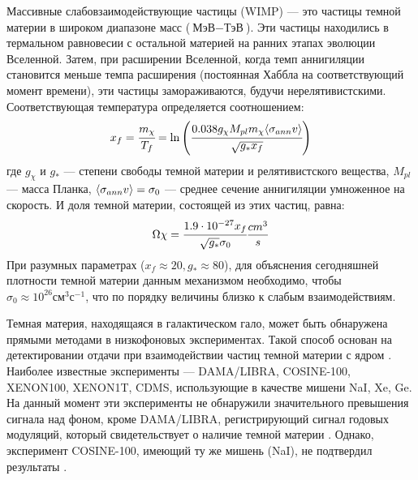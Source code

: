 Массивные слабовзаимодействующие частицы (WIMP) --- это частицы темной материи в широком диапазоне масс ($\text{МэВ}-\text{ТэВ}$). Эти частицы находились в термальном равновесии с остальной материей на ранних этапах эволюции Вселенной. Затем, при расширении Вселенной, когда темп аннигиляции становится меньше темпа расширения (постоянная Хаббла на соответствующий момент времени), эти частицы замораживаются, будучи нерелятивистскими\cite{Kolb:1990vq}. Соответствующая температура определяется соотношением: 
\begin{equation}
	x_f = \cfrac{m_{\chi} }{T_f} = \ln {\left(\cfrac{0.038 g_{\chi} M_{pl} m_{\chi}  \langle \sigma_{ann} v \rangle}
		{\sqrt{g_* x_f}}\right)}
\end{equation}
где $g_{\chi}$ и $g_*$ --- степени свободы темной материи и релятивистского вещества, $M_{pl}$ --- масса Планка, $\langle \sigma_{ann} v \rangle = \sigma_0$ --- среднее сечение аннигиляции умноженное на скорость. И доля темной материи, состоящей из этих частиц, равна: 
\begin{equation}
	\Omega{\chi} = \cfrac{{1.9}\cdot 10^{-27} x_f}{\sqrt{g_*} \sigma_0} \frac{cm^3}{s}
\end{equation}
При разумных параметрах ($x_f \approx 20, g_* \approx 80$), для объяснения сегодняшней плотности темной материи данным механизмом необходимо, чтобы $\sigma_0 \approx 10^{26} \text{см}^3\text{с}^{-1}$, что по порядку величины близко к слабым взаимодействиям.

Темная материя, находящаяся в галактическом гало, может быть обнаружена прямыми методами в низкофоновых экспериментах. Такой способ основан на детектировании отдачи при взаимодействии частиц темной материи с ядром \cite{Schumann_2019}. Наиболее известные эксперименты --- DAMA/LIBRA, COSINE-100, XENON100, XENON1T, CDMS, использующие в качестве мишени NaI, Xe, Ge. На данный момент эти эксперименты не обнаружили значительного превышения сигнала над фоном, кроме DAMA/LIBRA, регистрирующий сигнал годовых модуляций, который свидетельствует о наличие темной материи \cite{Bernabei_2018}. Однако, эксперимент COSINE-100, имеющий ту же мишень (NaI), не подтвердил результаты \cite{Adhikari_2022}.


